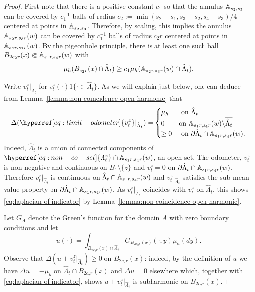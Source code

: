 \documentclass[12pt]{amsart}
\numberwithin{equation}{section}
\newcommand{\cluster}[2]{\hyperref[eq:non-co-set]{\mathit{\Lambda}^{#1}_{#2}}}
\newcommand{\odometer}[2]{\hyperref[eq:limit-odometer]{v^{#1}_{#2}}}
\begin{document}
	\begin{proof}
		First note that there is a positive constant $c_1$ so that the annulus $\mathbb{A}_{s_2, s_3}$ can be covered by $c_1^{-1}$ 
		balls of radius $c_2 := \min(s_2-s_1, s_3 -s_2, s_4-s_3)/4$ centered at points in $\mathbb{A}_{s_2, s_3}$. Therefore, by scaling,
		this implies the annulus $\mathbb{A}_{s_2 r, s_3 r}(w)$ can be covered by $c_1^{-1}$ balls of radius $c_2 r$
		centered at points in $\mathbb{A}_{s_2 r, s_3 r}(w)$. By the pigeonhole principle, there is at least one such ball $B_{2 c_2 r}(x) \Subset \mathbb{A}_{s_1 r, s_4 r}(w)$ 
		with 
		\begin{equation} \label{eq:ball-lower-bound-mass}
		\mu_h(B_{c_2r}(x) \cap \hat \Lambda_t) \geq c_1 \mu_h(\mathbb{A}_{ s_2 r,  s_3 r}(w) \cap \hat \Lambda_t).
		\end{equation}
		
		Write $\odometer{z}{t} |_{\hat \Lambda_t}$ for $\odometer{z}{t}(\cdot) 1\{ \cdot \in\hat \Lambda_t\}$.
		As we will explain just below, one can deduce from Lemma~\ref{lemma:non-coincidence-open-harmonic} that
		\begin{equation} \label{eq:laplacian-of-indicator}
		\Delta( \odometer{z}{t} |_{\hat \Lambda_t} ) = 
		\begin{cases}
		\mu_h &\mbox{ on $\hat \Lambda_t$ } \\
		0 &\mbox{on $\A_{s_1 r, s_4 r}(w) \backslash \overline{\hat \Lambda_t}$} \\
		\geq 0 &\mbox{ on $\partial \hat \Lambda_t \cap \A_{s_1 r, s_4 r}(w)$}.
		\end{cases}
		\end{equation}
		Indeed, $\hat \Lambda_t$ is a union of connected components of ${\cluster{z}{t}} \cap \A_{s_1 r, s_4 r}(w)$, 
		an open set. The odometer, $\odometer{z}{t}$ is non-negative and continuous on $B_1 \setminus \{z\}$ and $\odometer{z}{t} = 0$ on $\partial \hat \Lambda_t \cap \mathbb{A}_{s_1 r, s_4 r}(w)$. Therefore $\odometer{z}{t} |_{\hat \Lambda_t}$ is continuous on $\hat \Lambda_t \cap \mathbb{A}_{s_1 r, s_4 r}(w)$
		and $\odometer{z}{t} |_{\hat \Lambda_t}$  satisfies the sub-mean-value property on $\partial \hat \Lambda_t \cap \mathbb{A}_{s_1 r, s_4 r}(w)$.
		As $\odometer{z}{t} |_{\hat \Lambda_t}$ coincides with  $\odometer{z}{t}$ on $\hat \Lambda_t$, this shows \eqref{eq:laplacian-of-indicator} by Lemma~\ref{lemma:non-coincidence-open-harmonic}.
		
		
		Let $G_A$ denote the Green's function for the domain $A$ with zero boundary conditions
		and let 
		\[
		u(\cdot) = \int_{B_{2 c_2 r}(x) \cap \hat \Lambda_t} G_{B_{2 c_2 r}(x)}(\cdot,y) \mu_h(dy).
		\]
		Observe that $\Delta (u+\odometer{z}{t} |_{\hat \Lambda_t} ) \geq 0$ on $B_{2 c_2 r}(x)$: indeed, 
		by the definition of $u$ we have $\Delta u = -\mu_h$ on $\hat \Lambda_t \cap B_{2 c_2 r}(x)$ and $\Delta u = 0$ elsewhere
		which, together with \eqref{eq:laplacian-of-indicator}, shows $u+\odometer{z}{t} |_{\hat \Lambda_t} $ is subharmonic on $B_{2 c_2 r}(x)$.
		

\end{proof}
\end{document}
